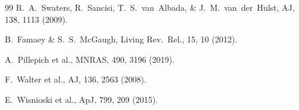 \documentclass[11pt]{article}
\begin{document}
\begin{thebibliography}{99}
R.~A.~Swaters, R.~Sancisi, T.~S.~van~Albada, \& J.~M.~van~der~Hulst, AJ, 138, 1113 (2009).

B.~Famaey \& S.~S.~McGaugh, Living Rev.~Rel., 15, 10 (2012).

A.~Pillepich et al., MNRAS, 490, 3196 (2019).

F.~Walter et al., AJ, 136, 2563 (2008).

E.~Wisnioski et al., ApJ, 799, 209 (2015).

\end{thebibliography}
\end{document}

